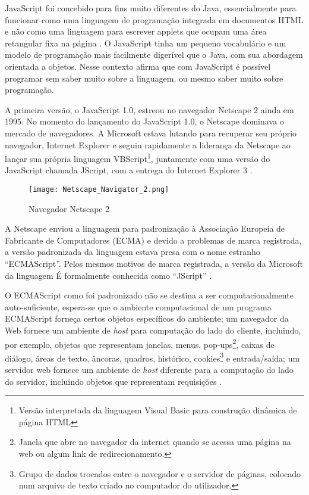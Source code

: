 JavaScript foi concebido para fins muito diferentes do Java, essencialmente para funcionar como uma linguagem de programação integrada em documentos HTML e não como uma linguagem para escrever applets que ocupam uma área retangular fixa na página \cite{goodman2007javascript}. O JavaScript tinha um pequeno vocabulário e um modelo de programação mais facilmente digerível que o Java, com sua abordagem orientada a objetos. Nesse contexto  afirma que com JavaScript é possível programar sem saber muito sobre a linguagem, ou mesmo saber muito sobre programação.

A primeira versão, o JavaScript 1.0, estreou no navegador Netscape 2 ainda em 1995. No momento do lançamento do JavaScript 1.0, o Netscape dominava o mercado de navegadores. A Microsoft estava lutando para recuperar seu próprio navegador, Internet Explorer e seguiu rapidamente a liderança da Netscape ao lançar sua própria linguagem VBScript\footnote{Versão interpretada da linguagem Visual Basic para construção dinâmica de página HTML}, juntamente com uma versão do JavaScript chamada JScript, com a entrega do Internet Explorer 3 \cite{keith2010dom}.

\begin{figure}[!htb]
	\centering
	\caption{Navegador Netscape 2}
	\texttt{[image: Netscape\_Navigator\_2.png]}
	\label{fig:netscape}
\end{figure}

A Netscape enviou a linguagem para padronização à Associação Europeia de Fabricante de Computadores (ECMA) e devido a problemas de marca registrada, a versão padronizada da linguagem estava presa com o nome estranho “ECMAScript”. Pelos mesmos motivos de marca registrada, a versão da Microsoft da linguagem É formalmente conhecida como “JScript” \cite{flanagan2011javascript}.

O ECMAScript como foi padronizado não se destina a ser computacionalmente auto-suficiente, espera-se que o ambiente computacional de um programa ECMAScript forneça certos objetos específicos do ambiente; um navegador da Web fornece um ambiente de \emph{host} para computação do lado do cliente, incluindo, por exemplo, objetos que representam janelas, menus, pop-ups\footnote{Janela que abre no navegador da internet quando se acessa uma página na web ou algum link de redirecionamento.}, caixas de diálogo, áreas de texto, âncoras, quadros, histórico, cookies\footnote{Grupo de dados trocados entre o navegador e o servidor de páginas, colocado num arquivo de texto criado no computador do utilizador.} e entrada/saída; um servidor web fornece um ambiente de \emph{host} diferente para a computação do lado do servidor, incluindo objetos que representam requisições \cite{ecmascript2016}.


